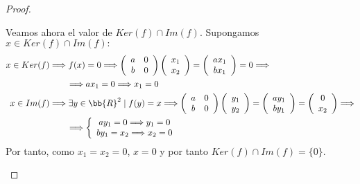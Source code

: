\begin{ejercicio}
\begin{proof}
\begin{description}
            Veamos ahora el valor de $Ker(f) \cap Im(f)$. Supongamos $x \in Ker(f) \cap Im(f):$
            \begin{equation*}\begin{split}
                x \in Ker(f) & \Longrightarrow f(x) = 0 \Longrightarrow
                 \left(\begin{array}{cc}
                    a & 0 \\
                    b & 0
                \end{array} \right)
                 \left(\begin{array}{c}
                    x_1 \\
                    x_2
                \end{array} \right) = 
                \left(\begin{array}{c}
                    ax_1 \\
                    bx_1
                \end{array} \right) = 0 \Longrightarrow\\
               &  \qquad \Longrightarrow ax_1 = 0 \Longrightarrow x_1 = 0 \\
               x \in Im(f) & \Longrightarrow \exists y\in \bb{R}^2 \mid f(y) = x \Longrightarrow
                 \left(\begin{array}{cc}
                    a & 0 \\
                    b & 0
                \end{array} \right)
                 \left(\begin{array}{c}
                    y_1 \\
                    y_2
                \end{array} \right) = 
                \left(\begin{array}{c}
                    ay_1 \\
                    by_1
                \end{array} \right) =
                \left(\begin{array}{c}
                    0 \\
                    x_2
                \end{array} \right) \Longrightarrow\\
               &  \qquad \Longrightarrow \left\{\begin{array}{c}
                   ay_1 = 0 \Longrightarrow y_1 = 0   \\
                   by_1 = x_2 \Longrightarrow x_2 = 0 
               \end{array} \right. \\
            \end{split}\end{equation*}
            Por tanto, como $x_1=x_2 = 0$, $x=0$ y por tanto $Ker(f) \cap Im(f)=\{0\}$.


\end{description}
\end{proof}
\end{ejercicio}

